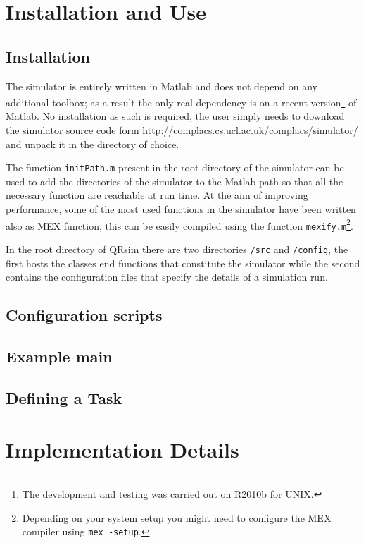\documentclass[a4paper,11pt]{report}
\newcommand{\sname}{QRsim\xspace}
\newcommand{\web}{\url{http://complacs.cs.ucl.ac.uk/complacs/simulator/}\xspace}
\begin{document}
\chapter{Installation and Use}

\section{Installation}
The simulator is entirely written in Matlab and does not depend on any additional toolbox; as a result the only real dependency is on a recent version\footnote{The development and testing was carried out on R2010b for UNIX.} of Matlab.
No installation as such is required, the user simply needs to download the simulator source code form \web and unpack it in the directory of choice.

The function \texttt{initPath.m} present in the root directory of the simulator can be used to add the directories of the simulator to the Matlab path so that all the necessary function are reachable at run time.
At the aim of improving performance, some of the most used functions in the simulator have been written also as MEX function, this can be easily compiled using the function \texttt{mexify.m}\footnote{Depending on your system setup you might need to configure the MEX compiler using \texttt{mex -setup}.}.
 
In the root directory of \sname there are two directories \texttt{/src} and \texttt{/config}, the first hosts the classes end functions that constitute the simulator while the second contains the configuration files that specify the details of a simulation run.

\section{Configuration scripts}  \label{sec:config}



\section{Example main}




\section{Defining a Task}


\appendix
\chapter{Implementation Details}
\end{document}
